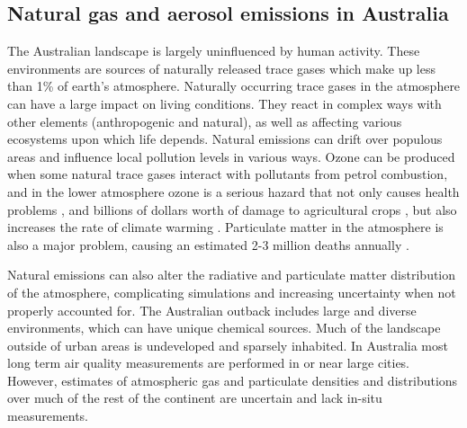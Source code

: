 \subsection{Natural gas and aerosol emissions in Australia}

The Australian landscape is largely uninfluenced by human activity.
These environments are sources of naturally released trace gases which make up less than 1\% of earth's atmosphere.
Naturally occurring trace gases in the atmosphere can have a large impact on living conditions.
They react in complex ways with other elements (anthropogenic and natural), as well as affecting various ecosystems upon which life depends.
Natural emissions can drift over populous areas and influence local pollution levels in various ways.
Ozone can be produced when some natural trace gases interact with pollutants from petrol combustion, and in the lower atmosphere ozone is a serious hazard that not only causes health problems \cite{Hsieh_2013}, and billions of dollars worth of damage to agricultural crops \cite{Avnery_2011}, but also increases the rate of climate warming \cite{IPCC_2013_chap8}.
Particulate matter in the atmosphere is also a major problem, causing an estimated 2-3 million deaths annually \cite{Hoek_2013, 19627030, Silva_2013, Lelieveld_2015}.

Natural emissions can also alter the radiative and particulate matter distribution of the atmosphere, complicating simulations and increasing uncertainty when not properly accounted for.
The Australian outback includes large and diverse environments, which can have unique chemical sources.
Much of the landscape outside of urban areas is undeveloped and sparsely inhabited.
In Australia most long term air quality measurements are performed in or near large cities.
However, estimates of atmospheric gas and particulate densities and distributions over much of the rest of the continent are uncertain and lack in-situ measurements.
